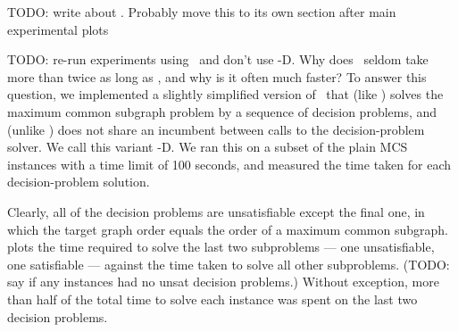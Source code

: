 TODO: write about \McSplitDown. Probably move this to its own section
after main experimental plots

TODO: re-run experiments using \McSplitDown\ and don't use \McSplit-D.
Why does \McSplitDown\ seldom take more than twice as long as \McSplit,
and why is it often much faster?  To answer this question, we implemented
a slightly simplified version of \McSplitDown\ that (like \McSplitDown)
solves the maximum
common subgraph problem by a sequence of decision problems, and
(unlike \McSplitDown) does not share an incumbent between calls to the decision-problem solver.
We call this variant \McSplit-D.  We ran this on a subset of
the plain MCS instances with a time limit of 100 seconds, and measured the
time taken for each decision-problem solution.

Clearly, all of the decision problems are unsatisfiable except the final one,
in which the target graph order equals the order of a maximum common subgraph.
 plots the time required
to solve the last two subproblems --- one unsatisfiable, one satisfiable ---
against the time taken to solve all other
subproblems.  (TODO: say if any instances had no unsat decision problems.)
Without exception, more than half of the total time to solve
each instance was spent on the last two decision problems.

